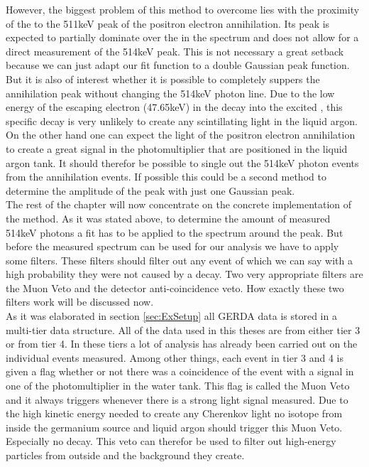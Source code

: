 However, the biggest problem of this method to overcome lies with the proximity of the \Kr to the 511keV peak of the positron electron annihilation. 
Its peak is expected to partially dominate over the \Kr in the spectrum and does not allow for a direct measurement of the 514keV peak. 
This is not necessary a great setback because we can just adapt our fit function to a double Gaussian peak function.
But it is also of interest whether it is possible to completely suppers the annihilation peak without changing the 514keV photon line.
Due to the low energy of the escaping electron (47.65keV) in the \Kr decay into the excited , this specific decay is very unlikely to create any scintillating light in the liquid argon. 
On the other hand one can expect the light of the positron electron annihilation to create a great signal in the photomultiplier that are positioned in the liquid argon tank.
It should therefor be possible to single out the 514keV photon events from the annihilation events.
If possible this could be a second method to determine the amplitude of the peak with just one Gaussian peak.
\\

The rest of the chapter will now concentrate on the concrete implementation of the method.
As it was stated above, to determine the amount of measured 514keV photons a fit has to be applied to the spectrum around the peak. 
But before the measured spectrum can be used for our analysis we have to apply some filters.
These filters should filter out any event of which we can say with a high probability they were not caused by a \Kr decay.
Two very appropriate filters are the Muon Veto and the detector anti-coincidence veto.
How exactly these two filters work will be discussed now.
\\

As it was elaborated in section \ref{sec:ExSetup} all GERDA data is stored in a multi-tier data structure. 
All of the data used in this theses are from either tier 3 or from tier 4.
In these tiers a lot of analysis has already been carried out on the individual events measured. 
Among other things, each event in tier 3 and 4 is given a flag whether or not there was a coincidence of the event with a signal in one of the photomultiplier in the water tank.
This flag is called the Muon Veto and it always triggers whenever there is a strong light signal measured.
Due to the high kinetic energy needed to create any Cherenkov light no isotope from inside the germanium source and liquid argon should trigger this Muon Veto.
Especially no \Kr decay. 
This veto can therefor be used to filter out high-energy particles from outside and the background they create.
\\

